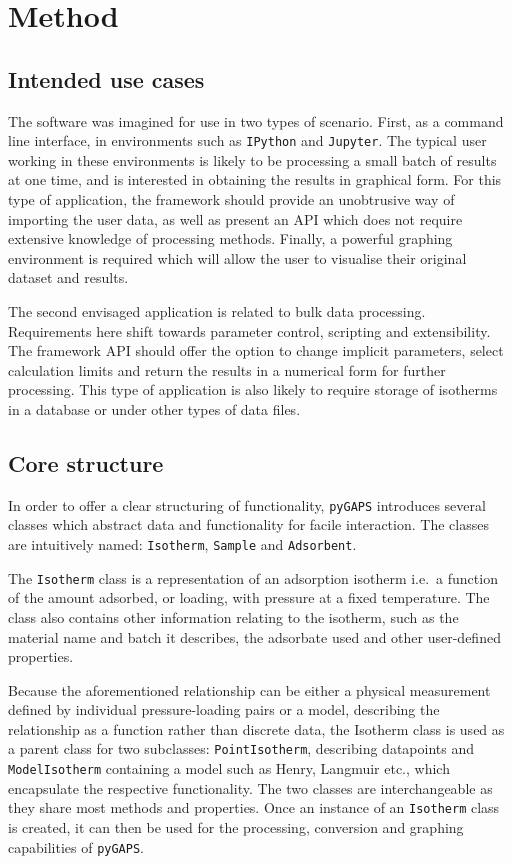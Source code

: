 
\section{Method}

\subsection{Intended use cases}

The software was imagined for use in two types of scenario. First, as a command line
interface, in environments such as \texttt{IPython} and \texttt{Jupyter}. 
The typical user working
in these environments is likely to be processing a small batch of 
results at one time, and is interested in obtaining the results in graphical form.
For this type of application, the framework should provide an unobtrusive 
way of importing the user data, as well as present an API which does not require 
extensive knowledge of processing methods. Finally, a powerful graphing
environment is required which will allow the user to visualise their original 
dataset and results.

The second envisaged application is related to bulk data processing. 
Requirements here shift towards parameter control, scripting and extensibility.
The framework API should offer the option to change implicit parameters, 
select calculation limits and return the results in a numerical form
for further processing. This type of application is also likely to require storage
of isotherms in a database or under other types of data files.

\subsection{Core structure}

In order to offer a clear structuring of functionality, \texttt{pyGAPS} introduces several 
classes which abstract data and functionality for facile interaction. The classes are
intuitively named: \texttt{Isotherm}, \texttt{Sample} and \texttt{Adsorbent}.

The \texttt{Isotherm} class is a representation of an adsorption isotherm i.e.\ a function of
the amount adsorbed, or loading, with pressure at a fixed temperature. The class also contains
other information relating to the isotherm, such as the material name and batch
it describes, the adsorbate used and other user-defined properties.

Because the aforementioned relationship can be either a physical measurement defined by 
individual pressure-loading pairs or a model, describing the 
relationship as a function rather than discrete data, the Isotherm class is used as 
a parent class for two subclasses: \texttt{PointIsotherm}, describing datapoints and 
\texttt{ModelIsotherm} containing a model such as Henry, Langmuir etc., which encapsulate
the respective functionality. The two classes are interchangeable as they
share most methods and properties.
Once an instance of an \texttt{Isotherm} class is created, it can then be used for the 
processing, conversion and graphing capabilities of \texttt{pyGAPS}.

